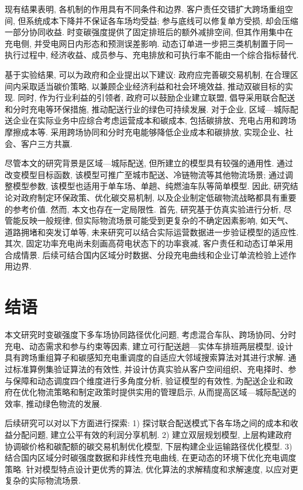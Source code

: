 \documentclass{setp-new}
\begin{document}
现有结果表明, 各机制的作用具有不同条件和边界.
客户责任交错扩大跨场重组空间, 但系统成本下降并不保证各车场均受益;
参与底线可以修复单方受损, 却会压缩一部分协同收益.
时变碳强度提供了固定排班后的额外减排空间,
但其作用集中在充电侧, 并受电网日内形态和预测误差影响.
动态订单进一步把三类机制置于同一执行过程中,
经济收益、成员参与、充电排放和可执行率不能由一个综合指标替代.

基于实验结果, 可以为政府和企业提出以下建议:
政府应完善碳交易机制, 在合理区间内采取适当碳价策略,
以兼顾企业经济利益和社会环境效益, 推动双碳目标的实现.
同时, 作为行业利益的引领者,
政府可以鼓励企业建立联盟, 倡导采用联合配送和分时充电等环保措施,
推动配送行业的绿色可持续发展.
对于企业,
区域—城际配送企业在实际业务中应综合考虑运营成本和碳成本,
包括碳排放、充电占用和跨场摩擦成本等.
采用跨场协同和分时充电能够降低企业成本和碳排放,
实现企业、社会、客户三方共赢.

尽管本文的研究背景是区域—城际配送, 但所建立的模型具有较强的通用性.
通过改变模型目标函数, 该模型可推广至城市配送、冷链物流等其他物流场景;
通过调整模型参数, 该模型也适用于单车场、单趟、纯燃油车队等简单模型.
因此, 研究结论对政府制定环保政策、优化碳交易机制,
以及企业制定低碳物流战略都具有重要的参考价值.
然而, 本文也存在一定局限性.
首先, 研究基于仿真实验进行分析, 尽管能反映一般规律,
但实际物流场景可能受到更复杂的不确定因素影响,
如天气、道路拥堵和突发订单等,
未来研究可以结合实际运营数据进一步验证模型的适应性.
其次, 固定功率充电尚未刻画高荷电状态下的功率衰减,
客户责任和动态订单采用合成情景.
后续可结合国内区域分时数据、分段充电曲线和企业订单流检验上述作用边界.

\section{结语}

本文研究时变碳强度下多车场协同路径优化问题,
考虑混合车队、跨场协同、分时充电、动态需求和参与约束等因素,
建立可行配送趟—实体车排班两层模型,
设计具有跨场重组算子和碳感知充电重调度的自适应大邻域搜索算法对其进行求解.
通过标准算例集验证算法的有效性,
并设计仿真实验从客户空间组织、充电择时、参与保障和动态调度四个维度进行多角度分析,
验证模型的有效性,
为配送企业和政府在优化物流策略和制定政策时提供实用的管理启示,
从而提高区域—城际配送的效率, 推动绿色物流的发展.

后续研究可以对以下方面进行探索:
1) 探讨联合配送模式下各车场之间的成本和收益分配问题,
  建立公平有效的利润分享机制.
2) 建立双层规划模型,
  上层构建政府协调碳价格和碳配额的碳交易机制优化模型,
  下层构建企业运输路径优化模型.
3) 结合国内区域分时碳强度数据和非线性充电曲线,
  在更动态的环境下优化充电调度策略.
针对模型特点设计更优秀的算法,
优化算法的求解精度和求解速度,
以应对更复杂的实际物流场景.
\end{document}
